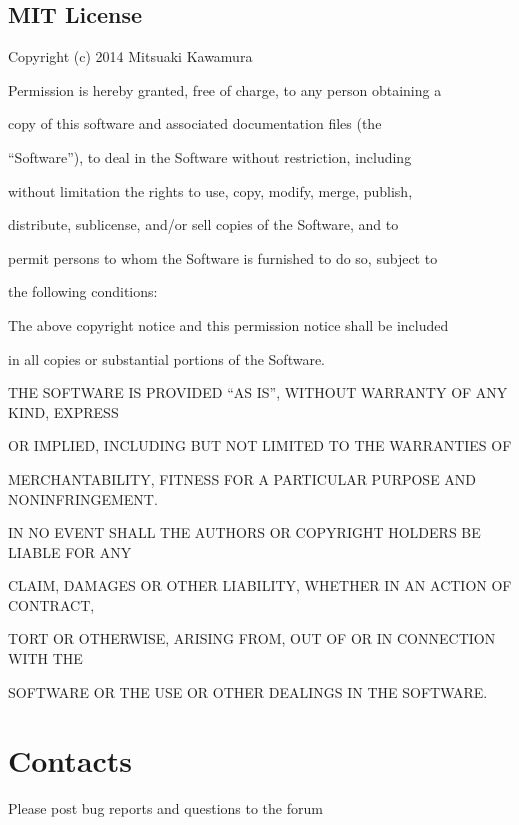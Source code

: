 \documentclass[letterpaper,10pt,pdftex,openany,english]{sphinxmanual}
\begin{document}
\section{MIT License}
\label{\detokenize{copy:mit-license}}\label{\detokenize{copy:mitlicense}}
\begin{DUlineblock}{0em}
\item[] Copyright (c) 2014 Mitsuaki Kawamura
\item[] 
\item[] Permission is hereby granted, free of charge, to any person obtaining a
\item[] copy of this software and associated documentation files (the
\item[] “Software”), to deal in the Software without restriction, including
\item[] without limitation the rights to use, copy, modify, merge, publish,
\item[] distribute, sublicense, and/or sell copies of the Software, and to
\item[] permit persons to whom the Software is furnished to do so, subject to
\item[] the following conditions:
\item[] 
\item[] The above copyright notice and this permission notice shall be included
\item[] in all copies or substantial portions of the Software.
\item[] 
\item[] THE SOFTWARE IS PROVIDED “AS IS”, WITHOUT WARRANTY OF ANY KIND, EXPRESS
\item[] OR IMPLIED, INCLUDING BUT NOT LIMITED TO THE WARRANTIES OF
\item[] MERCHANTABILITY, FITNESS FOR A PARTICULAR PURPOSE AND NONINFRINGEMENT.
\item[] IN NO EVENT SHALL THE AUTHORS OR COPYRIGHT HOLDERS BE LIABLE FOR ANY
\item[] CLAIM, DAMAGES OR OTHER LIABILITY, WHETHER IN AN ACTION OF CONTRACT,
\item[] TORT OR OTHERWISE, ARISING FROM, OUT OF OR IN CONNECTION WITH THE
\item[] SOFTWARE OR THE USE OR OTHER DEALINGS IN THE SOFTWARE.
\end{DUlineblock}

\sphinxstepscope


\chapter{Contacts}
\label{\detokenize{contact:contacts}}\label{\detokenize{contact::doc}}
\sphinxAtStartPar
Please post bug reports and questions to the forum
\begin{quote}

\sphinxAtStartPar
{}
\end{quote}
\end{document}
